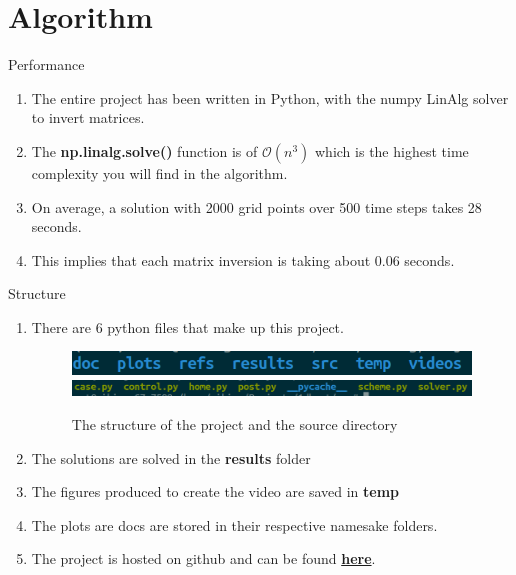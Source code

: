 \documentclass[10pt,compress]{beamer}
\begin{document}
\section{Algorithm}
\begin{frame}{Performance}
\begin{enumerate}
\item The entire project has been written in Python, with the numpy LinAlg solver to invert matrices.
\item The \textbf{np.linalg.solve()} function is of $\mathcal{O}(n^{3})$ which is the highest time complexity you will find in the algorithm.
\item On average, a solution with 2000 grid points over 500 time steps takes 28 seconds.
\item This implies that each matrix inversion is taking about 0.06 seconds.
\end{enumerate}
\end{frame}
\begin{frame}{Structure}
\begin{enumerate}
\item There are 6 python files that make up this project.
\begin{figure}
\begin{center}
\includegraphics[scale=0.30]{dir.png}
\includegraphics[scale=0.30]{srcdir.png}
\caption{The structure of the project and the source directory}
\label{dir}
\end{center}
\end{figure}
\item The solutions are solved in the \textbf{results} folder
\item The figures produced to create the video are saved in \textbf{temp}
\item The plots are docs are stored in their respective namesake folders.
\item The project is hosted on github and can be found \href{https://github.com/VishalKandala/1DiffCrank}{\textbf{here}}.
\end{enumerate}
\end{frame}
\end{document}
